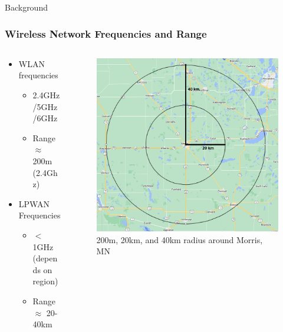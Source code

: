 \documentclass{beamer}
\begin{document}
\begin{frame}{Background}
  \frametitle{Wireless Network Frequencies and Range}
  \begin{columns}
    \begin{column}{0.5\textwidth}
      \begin{itemize}
        \item WLAN frequencies
          \begin{itemize}
            \item 2.4GHz/5GHz/6GHz
            \item Range $\approx$ 200m (2.4Ghz)
          \end{itemize}
        \item LPWAN Frequencies
          \begin{itemize}
            \item $<$1GHz (depends on region)
            \item Range $\approx$ 20-40km
          \end{itemize}
      \end{itemize}
    \end{column}
    \begin{column}{0.5\textwidth}
      \begin{figure}[htbp]
        \centering
        \includegraphics[width=.9\textwidth]{Range_comparisons.png}
        \caption{200m, 20km, and 40km radius around Morris, MN}
        \label{fig:Range_map}
      \end{figure}
  \end{column}
  \end{columns}
\end{frame}
\end{document}
